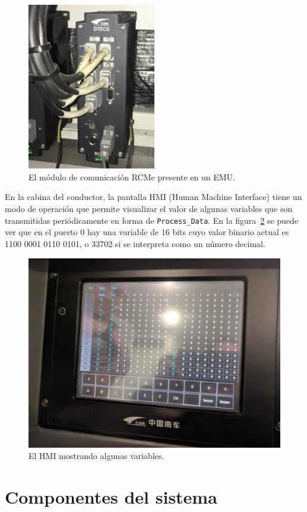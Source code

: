 \begin{figure}[htbp]
	\centering
	\includegraphics[width=0.5\textwidth]{./Figures/RCMe.jpeg}
	\caption[El módulo de comunicación RCMe]{El módulo de comunicación RCMe presente en un EMU.
        \\ }
    \label{fig:rcme}
\end{figure}

En la cabina del conductor, la pantalla HMI (Human Machine Interface) tiene un modo de operación que permite visualizar el valor de algunas variables que son transmitidas periódicamente en forma de \texttt{Process\_Data}. En la figura~\ref{fig:hmi} se puede ver que en el puerto 0 hay una variable de 16 bits cuyo valor binario actual es 1100 0001 0110 0101, o 33702 si se interpreta como un número decimal.

\begin{figure}[htbp]
	\centering
	\includegraphics[width=1\textwidth]{./Figures/hmi.jpg}
	\caption[El HMI mostrando algunas variables]{El HMI mostrando algunas variables.}
    \label{fig:hmi}
\end{figure}



\section{Componentes del sistema}
